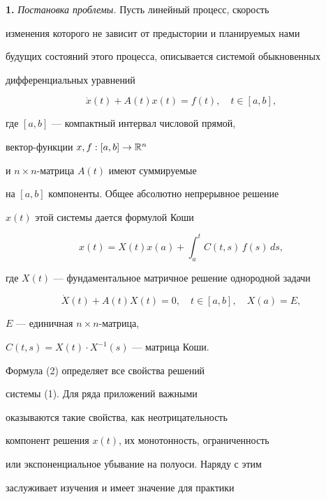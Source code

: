 \label{begin}





{\bf 1.} {\it Постановка проблемы.} Пусть линейный процесс, скорость


изменения которого не зависит от предыстории и планируемых нами


будущих состояний этого процесса, описывается системой обыкновенных


дифференциальных уравнений


\begin{equation}


\Dot x(t)+A(t)x(t)=f(t),\quad t\in [a,b], %


\end{equation}


где $[a,b]$ --- компактный интервал числовой прямой,


вектор-функции $x,f: [a,b]\to \Bbb R^n$


и $n\times n$-матрица $A(t)$ имеют суммируемые


на $[a,b]$ компоненты. Общее абсолютно непрерывное решение


$x(t)$ этой системы дается формулой Коши


\begin{equation}


x(t)=X(t)x(a)+\int_a^t C(t,s)\,f(s)\,ds, %


\end{equation}


где $X(t)$ --- фундаментальное матричное решение однородной задачи


$$


\Dot X(t)+A(t)X(t) = 0,\quad t\in [a,b],\quad X(a) = E,


$$


$E$ --- единичная $n\times n$-матрица,


$C(t,s)=X(t)\cdot X^{-1}(s)$ --- матрица Коши.





Формула (2) определяет все свойства решений


системы (1). Для ряда приложений важными


оказываются такие свойства, как неотрицательность


компонент решения $x(t)$, их монотонность, ограниченность


или экспоненциальное убывание на полуоси. Наряду с этим


заслуживает изучения и имеет значение для практики


